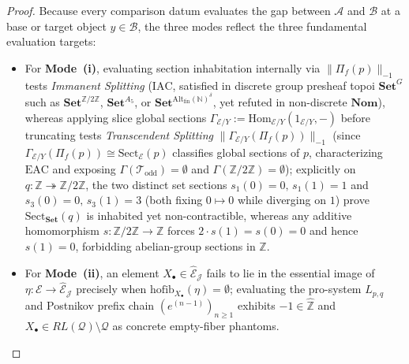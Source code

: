 \begin{proof}
Because every comparison datum evaluates the gap between $\mathcal{A}$ and $\mathcal{B}$ at a base or target object $y \in \mathcal{B}$, the three modes reflect the three fundamental evaluation targets:
\begin{itemize}
  \item For \textbf{Mode~(i)}, evaluating section inhabitation internally via $\|\Pi_f(p)\|_{-1}$ tests \emph{Immanent Splitting} ($\mathrm{IAC}$, satisfied in discrete group presheaf topoi $\mathbf{Set}^G$ such as $\mathbf{Set}^{\mathbb{Z}/2\mathbb{Z}}$, $\mathbf{Set}^{A_5}$, or $\mathbf{Set}^{\mathrm{Alt}_{\mathrm{fin}}(\mathbb{N})^\delta}$, yet refuted in non-discrete $\mathbf{Nom}$), whereas applying slice global sections $\Gamma_{\mathcal{E}/Y} := \mathrm{Hom}_{\mathcal{E}/Y}(1_{\mathcal{E}/Y}, -)$ before truncating tests \emph{Transcendent Splitting} $\|\Gamma_{\mathcal{E}/Y}(\Pi_f(p))\|_{-1}$ (since $\Gamma_{\mathcal{E}/Y}(\Pi_f(p)) \cong \mathrm{Sect}_{\mathcal{E}}(p)$ classifies global sections of $p$, characterizing $\mathrm{EAC}$ and exposing $\Gamma(\mathcal{T}_{\mathrm{odd}}) = \emptyset$ and $\Gamma(\mathbb{Z}/2\mathbb{Z}) = \emptyset$); explicitly on $q : \mathbb{Z} \twoheadrightarrow \mathbb{Z}/2\mathbb{Z}$, the two distinct set sections $s_1(0) = 0,\, s_1(1) = 1$ and $s_3(0) = 0,\, s_3(1) = 3$ (both fixing $0 \mapsto 0$ while diverging on $1$) prove $\mathrm{Sect}_{\mathbf{Set}}(q)$ is inhabited yet non-contractible, whereas any additive homomorphism $s : \mathbb{Z}/2\mathbb{Z} \to \mathbb{Z}$ forces $2\cdot s(1) = s(0) = 0$ and hence $s(1) = 0$, forbidding abelian-group sections in $\mathbb{Z}$.
  \item For \textbf{Mode~(ii)}, an element $X_\bullet \in \widehat{\mathcal{E}}_{\mathcal{J}}$ fails to lie in the essential image of $\eta : \mathcal{E} \to \widehat{\mathcal{E}}_{\mathcal{J}}$ precisely when $\mathrm{hofib}_{X_\bullet}(\eta) = \emptyset$; evaluating the pro-system $L_{p,q}$ and Postnikov prefix chain $(e^{(n-1)})_{n \ge 1}$ exhibits $-1 \in \widehat{\mathbb{Z}}$ and $X_\bullet \in RL(\mathcal{Q}) \setminus \mathcal{Q}$ as concrete empty-fiber phantoms.

\end{itemize}
\end{proof}
